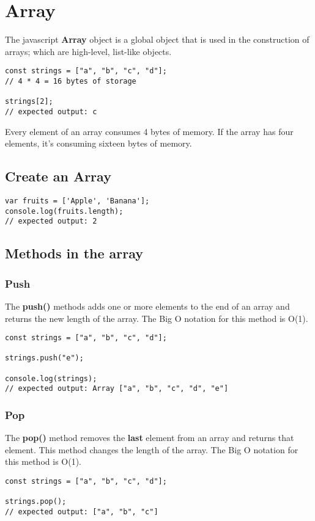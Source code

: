 \section{Array}
The javascript \textbf{Array} object is a global object that is used in the construction of arrays; which are high-level, list-like objects.
\begin{lstlisting}
const strings = ["a", "b", "c", "d"];
// 4 * 4 = 16 bytes of storage

strings[2]; 
// expected output: c
\end{lstlisting}
Every element of an array consumes 4 bytes of memory. If the array has four elements, it's consuming sixteen bytes of memory.

\subsection{Create an Array}
\begin{lstlisting}
var fruits = ['Apple', 'Banana'];
console.log(fruits.length);
// expected output: 2
\end{lstlisting}

\subsection{Methods in the array}

\subsubsection{Push}
The \textbf{push()} methods adds one or more elements to the end of an array and returns the new length of the array. The Big O notation for this method is O(1).
\begin{lstlisting}
const strings = ["a", "b", "c", "d"];

strings.push("e");

console.log(strings); 
// expected output: Array ["a", "b", "c", "d", "e"]
\end{lstlisting}


\subsubsection{Pop}
The \textbf{pop()} method removes the \textbf{last} element from an array and returns that element. This method changes the length of the array. The Big O notation for this method is O(1).

\begin{lstlisting}
const strings = ["a", "b", "c", "d"];

strings.pop();
// expected output: ["a", "b", "c"]
\end{lstlisting}

